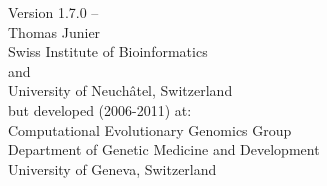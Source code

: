 
\setuppagenumbering[state=stop]


\startalignment[center]
Version 1.7.0 -- \currentdate \\
Thomas Junier  \\
Swiss Institute of Bioinformatics \\
and \\
University of Neuch\^{a}tel, Switzerland \\
but developed (2006-2011) at: \\
Computational Evolutionary Genomics Group \\
Department of Genetic Medicine and Development \\
University of Geneva, Switzerland \\
\stopalignment
